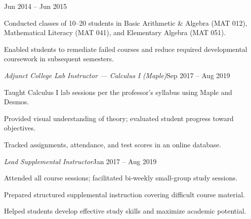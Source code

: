 \documentclass[a4paper, 12pt]{article}
\newcommand{\workrole}[2]{%
  \noindent\hspace*{1em}\textit{#1}\hfill #2\par
}
\newcommand{\workunit}[1]{%
  \noindent\hspace*{1em}{\small\itshape #1}\par
}
\newcommand{\workassignment}[2]{%
  \noindent\hspace*{2em}{\small\itshape #1}\hfill{\small #2}\par
}
\begin{document}
\begin{flushleft}
\vspace{4pt}

\noindent\begin{minipage}{\linewidth}
\workassignment{Summer Immersion Program}{Jun 2014 -- Jun 2015}
\begin{compactitem}
    \item Conducted classes of 10--20 students in Basic Arithmetic \& Algebra (MAT 012),
          Mathematical Literacy (MAT 041), and Elementary Algebra (MAT 051).
    \item Enabled students to remediate failed courses and reduce required developmental
          coursework in subsequent semesters.
\end{compactitem}
\end{minipage}

\vspace{4pt}

\noindent\begin{minipage}{\linewidth}
\workrole{Adjunct College Lab Instructor --- Calculus I (Maple)}{Sep 2017 -- Aug 2019}
\workunit{Additional role --- Department of Mathematics}
\begin{compactitem}
    \item Taught Calculus I lab sessions per the professor's syllabus using Maple and Desmos.
    \item Provided visual understanding of theory; evaluated student progress toward objectives.
    \item Tracked assignments, attendance, and test scores in an online database.
\end{compactitem}
\end{minipage}

\vspace{4pt}

\noindent\begin{minipage}{\linewidth}
\workrole{Lead Supplemental Instructor}{Jan 2017 -- Aug 2019}
\begin{compactitem}
    \item Attended all course sessions; facilitated bi-weekly small-group study sessions.
    \item Prepared structured supplemental instruction covering difficult course material.
    \item Helped students develop effective study skills and maximize academic potential.
\end{compactitem}
\end{minipage}

\vspace{8pt}


\end{flushleft}
\end{document}
